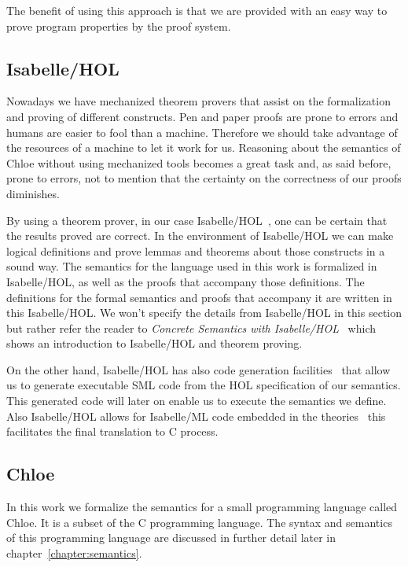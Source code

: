 The benefit of using this approach is that we are provided with an easy way to prove program properties by the proof system.


\subsection{Isabelle/HOL}\label{section:isabelle/hol}

Nowadays we have mechanized theorem provers that assist on the formalization and proving of different constructs.
Pen and paper proofs are prone to errors and humans are easier to fool than a machine.
Therefore we should take advantage of the resources of a machine to let it work for us.
Reasoning about the semantics of Chloe without using mechanized tools becomes a great task and, as said before, prone to errors, not to mention that the certainty on the correctness of our proofs diminishes.

By using a theorem prover, in our case Isabelle/HOL~\parencite{isabelle-tutorial}, one can be certain that the results proved are correct.
In the environment of Isabelle/HOL we can make logical definitions and prove lemmas and theorems about those constructs in a sound way.
The semantics for the language used in this work is formalized in Isabelle/HOL, as well as the proofs that accompany those definitions.
The definitions for the formal semantics and proofs that accompany it are written in this Isabelle/HOL.
We won't specify the details from Isabelle/HOL in this section but rather refer the reader to \textit{Concrete Semantics with Isabelle/HOL}~\parencite{nipkow} which shows an introduction to Isabelle/HOL and theorem proving.

On the other hand, Isabelle/HOL has also code generation facilities~\parencite{isabelle-codegen} that allow us to generate executable SML code from the HOL specification of our semantics.
This generated code will later on enable us to execute the semantics we define.
Also Isabelle/HOL allows for Isabelle/ML code embedded in the theories~\parencite{isabelle-implementation} this facilitates the final translation to C process.

\subsection{Chloe}\label{subsection:chloe}

In this work we formalize the semantics for a small programming language called Chloe.
It is a subset of the C programming language.
The syntax and semantics of this programming language are discussed in further detail later in chapter~\ref{chapter:semantics}.

